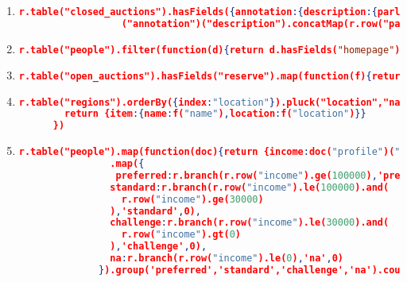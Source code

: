\begin{enumerate}[label=Q\arabic*.]
    \item \label{rethink-q-16}%
	\begin{lstlisting}[language=JSON, basicstyle=\scriptsize]
	  r.table("closed_auctions").hasFields({annotation:{description:{parlist:true}}})
	              ("annotation")("description").concatMap(r.row("parlist")).hasFields({listitem:{parlist:true}})("listitem").concatMap(r.row("parlist")).hasFields({listitem:{text:{emph:{keyword:true}}}})
	\end{lstlisting}	

    
    \item \label{rethink-q-17}%
	\begin{lstlisting}[language=JSON, basicstyle=\scriptsize]
	  r.table("people").filter(function(d){return d.hasFields("homepage").not()}).map({person:{name:r.row("name")}})
	\end{lstlisting}	

    \item \label{rethink-q-18}%
	\begin{lstlisting}[language=JSON, basicstyle=\scriptsize]
	  r.table("open_auctions").hasFields("reserve").map(function(f){return f("reserve").mul(2.20371)})
	\end{lstlisting}	

    \item \label{rethink-q-19}%
	\begin{lstlisting}[language=JSON, basicstyle=\scriptsize]
	  r.table("regions").orderBy({index:"location"}).pluck("location","name").map(function(f){
	    return {item:{name:f("name"),location:f("location")}}
	  })
	\end{lstlisting}
	
    \item \label{rethink-q-20}%
	\begin{lstlisting}[language=JSON, basicstyle=\scriptsize]
	  r.table("people").map(function(doc){return {income:doc("profile")("income").default(0)}})
	            .map({
	             preferred:r.branch(r.row("income").ge(100000),'preferred',0),
	            standard:r.branch(r.row("income").le(100000).and(
	              r.row("income").ge(30000)
	            ),'standard',0),
	            challenge:r.branch(r.row("income").le(30000).and(
	              r.row("income").gt(0)
	            ),'challenge',0),
	            na:r.branch(r.row("income").le(0),'na',0)
	          }).group('preferred','standard','challenge','na').count()
	\end{lstlisting}

\end{enumerate}
